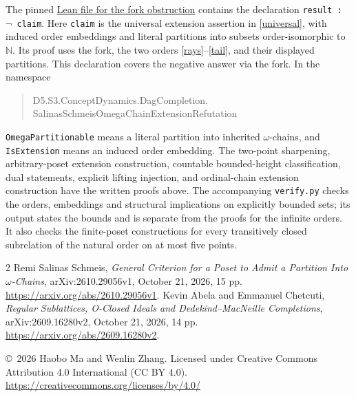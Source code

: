 \documentclass[11pt]{article}
\newcommand{\N}{\mathbb N}
\begin{document}
The pinned
\href{https://github.com/the-omega-institute/trureturing/blob/2b5b552e72596710282b713f6587c7020544535d/D5/S3/ConceptDynamics/DagCompletion/SalinasSchmeisOmegaChainExtensionRefutation.lean}{Lean file for the fork obstruction}
contains the declaration \texttt{result :\ $\neg$\ claim}.
Here \texttt{claim} is the universal extension assertion in
\eqref{universal}, with induced order embeddings and literal partitions into
subsets order-isomorphic to $\N$. Its proof uses the fork, the two orders
\eqref{rays}--\eqref{tail}, and their displayed partitions. This declaration
covers the negative answer via the fork. In the namespace
\begin{quote}\small\ttfamily
D5.S3.ConceptDynamics.DagCompletion.\\
SalinasSchmeisOmegaChainExtensionRefutation
\end{quote}
\noindent
\texttt{OmegaPartitionable} means a literal partition into inherited
$\omega$-chains, and \texttt{IsExtension} means an induced order embedding.
The two-point sharpening, arbitrary-poset extension construction, countable
bounded-height classification, dual statements, explicit lifting injection,
and ordinal-chain extension construction have the written proofs above.
The accompanying \texttt{verify.py} checks the orders,
embeddings and structural implications on explicitly bounded sets; its output
states the bounds and is separate from the proofs for the infinite orders.
It also checks the finite-poset constructions for every transitively closed
subrelation of the natural order on at most five points.

\begin{thebibliography}{2}
 Remi Salinas Schmeis,
\emph{General Criterion for a Poset to Admit a Partition Into
$\omega$-Chains}, arXiv:2610.29056v1, October 21, 2026, 15 pp.
\url{https://arxiv.org/abs/2610.29056v1}.
 Kevin Abela and Emmanuel Chetcuti,
\emph{Regular Sublattices, O-Closed Ideals and Dedekind--MacNeille Completions},
arXiv:2609.16280v2, October 21, 2026, 14 pp.
\url{https://arxiv.org/abs/2609.16280v2}.
\end{thebibliography}
\smallskip\noindent\small
\copyright\ 2026 Haobo Ma and Wenlin Zhang.
Licensed under Creative Commons Attribution 4.0 International (CC BY 4.0).
\url{https://creativecommons.org/licenses/by/4.0/}
\end{document}
